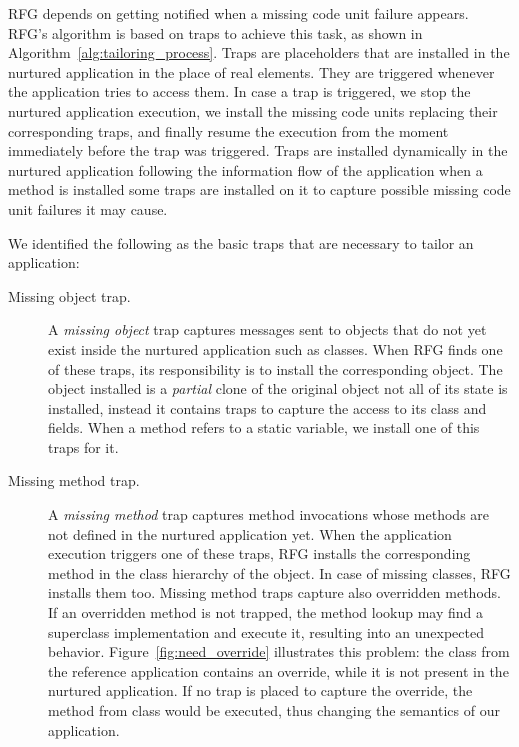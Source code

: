 RFG depends on getting notified when a missing code unit failure appears. RFG's algorithm is based on traps to achieve this task, as shown in Algorithm~\ref{alg:tailoring_process}. Traps are placeholders that are installed in the nurtured application in the place of real elements. They are triggered whenever the application tries to access them. In case a trap is triggered, we stop the nurtured application execution, we install the missing code units replacing their corresponding traps, and finally resume the execution from the moment immediately before the trap was triggered. Traps are installed dynamically in the nurtured application following the information flow of the application \eg when a method  is installed some traps are installed on it to capture possible missing code unit failures it may cause.

We identified the following as the basic traps that are necessary to tailor an application:

\begin{description}
\item[Missing object trap.] A \emph{missing object} trap captures messages sent to objects that do not yet exist inside the nurtured application such as classes. When RFG finds one of these traps, its responsibility is to install the corresponding object. The object installed is a \emph{partial} clone of the original object \ie not all of its state is installed, instead it contains traps to capture the access to its class and fields. When a method refers to a static variable, we install one of this traps for it.

\item[Missing method trap.] A \emph{missing method} trap captures me\-thod invocations whose methods are not defined in the nurtured application yet. When the application execution triggers one of these traps, RFG installs the corresponding method in the class hierarchy of the object. In case of missing classes, RFG installs them too. Missing method traps capture also overridden methods. If an overridden method is not trapped, the method lookup may find a superclass implementation and execute it, resulting into an unexpected behavior. Figure~\ref{fig:need_override} illustrates this problem: the class  from the reference application contains an override, while it is not present in the nurtured application. If no trap is placed to capture the override, the method  from class  would be executed, thus changing the semantics of our application.

\end{description}

